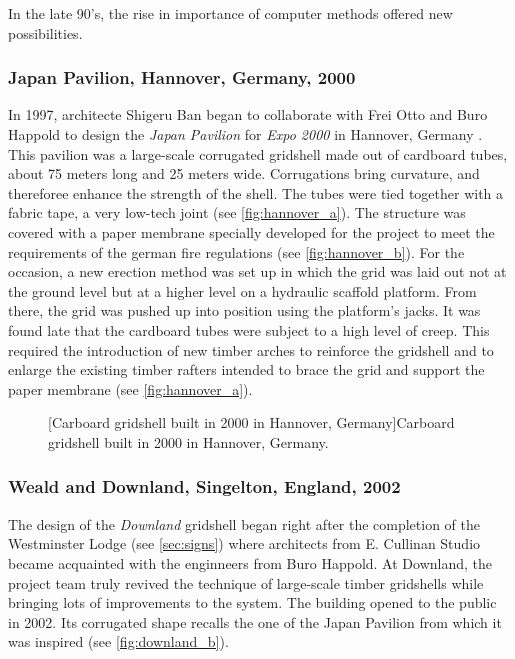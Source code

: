 In the late 90's, the rise in importance of computer methods offered new possibilities.

\subsubsection{Japan Pavilion, Hannover, Germany, 2000}
In 1997, architecte Shigeru Ban began to collaborate with Frei Otto and Buro Happold to design the \emph{Japan Pavilion} for \emph{Expo 2000} in Hannover, Germany \cite{Ban2006}. This pavilion was a large-scale corrugated gridshell made out of cardboard tubes, about 75 meters long and 25 meters wide. Corrugations bring curvature, and thereforee enhance the strength of the shell. The tubes were tied together with a fabric tape, a very low-tech joint (see \cref{fig:hannover_a}). The structure was covered with a paper membrane specially developed for the project to meet the requirements of the german fire regulations (see \cref{fig:hannover_b}). For the occasion, a new erection method was set up in which the grid was laid out not at the ground level but at a higher level on a hydraulic scaffold platform. From there, the grid was pushed up into position using the platform's jacks. It was found late that the cardboard tubes were subject to a high level of creep. This required the introduction of new timber arches to reinforce the gridshell and to enlarge the existing timber rafters intended to brace the grid and support the paper membrane (see \cref{fig:hannover_a}).
\begin{figure}[t]
		\hspace*{\fill}
		\vspace{10pt}
		[Carboard gridshell built in 2000 in Hannover, Germany]{Carboard gridshell built in 2000 in Hannover, Germany.}
		\label{fig:hannover}    
\end{figure}

\subsubsection{Weald and Downland, Singelton, England, 2002}
The design of the \emph{Downland} gridshell began right after the completion of the Westminster Lodge (see \cref{sec:signs}) where architects from E. Cullinan Studio became acquainted with the enginneers from Buro Happold. At Downland, the project team truly revived the technique of large-scale timber gridshells while bringing lots of improvements to the system. The building opened to the public in 2002. Its corrugated shape recalls the one of the Japan Pavilion from which it was inspired (see \cref{fig:downland_b}).

